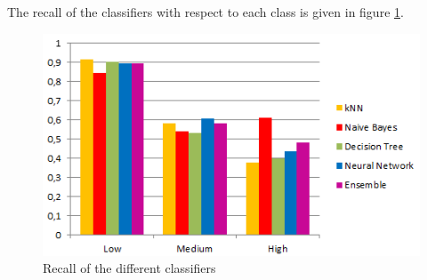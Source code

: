 \noindent The recall of the classifiers with respect to each class is given in figure
\ref{fig:recall}.

\begin{figure}[H]
	\centering
	\includegraphics[width=\columnwidth]{../../charts/recall.png}
	\caption{Recall of the different classifiers}
	\label{fig:recall}
\end{figure}




